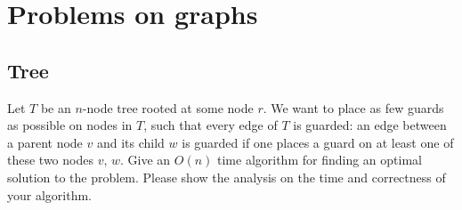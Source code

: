 \chapter{Problems on graphs}
\begin{refsection}

\section{Tree}
\begin{Exercise}
Let $T$ be an $n$-node tree rooted at some node $r$. We want to place as few guards as possible on nodes in $T$, such that every edge of $T$ is guarded: an edge between a parent node $v$ and its child $w$ is guarded if one places a guard on at least one of these two nodes $v$, $w$. Give an $O(n)$ time algorithm for finding an optimal solution to the problem. Please show the analysis on the time and correctness of your algorithm.
\end{Exercise}
\begin{Answer}
\end{Answer}


\end{refsection}
